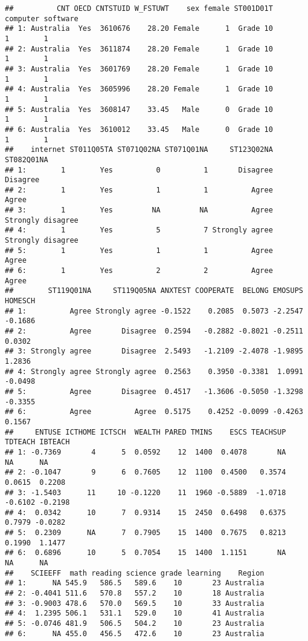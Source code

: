 \documentclass[
]{book}
\begin{document}
\begin{verbatim}
##          CNT OECD CNTSTUID W_FSTUWT    sex female ST001D01T computer software
## 1: Australia  Yes  3610676    28.20 Female      1  Grade 10        1        1
## 2: Australia  Yes  3611874    28.20 Female      1  Grade 10        1        1
## 3: Australia  Yes  3601769    28.20 Female      1  Grade 10        1        1
## 4: Australia  Yes  3605996    28.20 Female      1  Grade 10        1        1
## 5: Australia  Yes  3608147    33.45   Male      0  Grade 10        1        1
## 6: Australia  Yes  3610012    33.45   Male      0  Grade 10        1        1
##    internet ST011Q05TA ST071Q02NA ST071Q01NA     ST123Q02NA        ST082Q01NA
## 1:        1        Yes          0          1       Disagree          Disagree
## 2:        1        Yes          1          1          Agree             Agree
## 3:        1        Yes         NA         NA          Agree Strongly disagree
## 4:        1        Yes          5          7 Strongly agree Strongly disagree
## 5:        1        Yes          1          1          Agree             Agree
## 6:        1        Yes          2          2          Agree             Agree
##        ST119Q01NA     ST119Q05NA ANXTEST COOPERATE  BELONG EMOSUPS HOMESCH
## 1:          Agree Strongly agree -0.1522    0.2085  0.5073 -2.2547 -0.1686
## 2:          Agree       Disagree  0.2594   -0.2882 -0.8021 -0.2511  0.0302
## 3: Strongly agree       Disagree  2.5493   -1.2109 -2.4078 -1.9895  1.2836
## 4: Strongly agree Strongly agree  0.2563    0.3950 -0.3381  1.0991 -0.0498
## 5:          Agree       Disagree  0.4517   -1.3606 -0.5050 -1.3298 -0.3355
## 6:          Agree          Agree  0.5175    0.4252 -0.0099 -0.4263  0.1567
##     ENTUSE ICTHOME ICTSCH  WEALTH PARED TMINS    ESCS TEACHSUP TDTEACH IBTEACH
## 1: -0.7369       4      5  0.0592    12  1400  0.4078       NA      NA      NA
## 2: -0.1047       9      6  0.7605    12  1100  0.4500   0.3574  0.0615  0.2208
## 3: -1.5403      11     10 -0.1220    11  1960 -0.5889  -1.0718 -0.6102 -0.2198
## 4:  0.0342      10      7  0.9314    15  2450  0.6498   0.6375  0.7979 -0.0282
## 5:  0.2309      NA      7  0.7905    15  1400  0.7675   0.8213  0.1990  1.1477
## 6:  0.6896      10      5  0.7054    15  1400  1.1151       NA      NA      NA
##    SCIEEFF  math reading science grade learning    Region
## 1:      NA 545.9   586.5   589.6    10       23 Australia
## 2: -0.4041 511.6   570.8   557.2    10       18 Australia
## 3: -0.9003 478.6   570.0   569.5    10       33 Australia
## 4:  1.2395 506.1   531.1   529.0    10       41 Australia
## 5: -0.0746 481.9   506.5   504.2    10       23 Australia
## 6:      NA 455.0   456.5   472.6    10       23 Australia
\end{verbatim}
\end{document}
